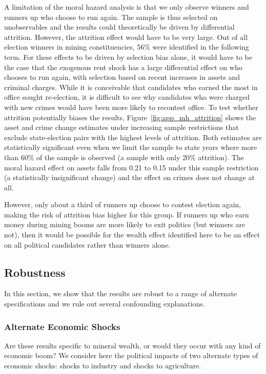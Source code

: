 \documentclass[12pt,letterpaper]{article}
\begin{document}
A limitation of the moral hazard analysis is that we only observe
winners and runners up who choose to run again. The sample is thus
selected on unobservables and the results could theoretically be
driven by differential attrition. However, the attrition effect would
have to be very large. Out of all election winners in mining
constituencies, 56\% were identified in the following term. For these
effects to be driven by selection bias alone, it would have to be the
case that the exogenous rent shock has a large differential effect on
who chooses to run again, with selection based on recent increases in
assets and criminal charges. While it is conceivable that candidates
who earned the most in office sought re-election, it is difficult to
see why candidates who were charged with new crimes would have been
more likely to recontest office. To test whether attrition potentially
biases the results, Figure~\ref{fig:app_mh_attrition} shows the asset
and crime change estimates under increasing sample restrictions that
exclude state-election pairs with the highest levels of
attrition. Both estimates are statistically significant even when we
limit the sample to state years where more than 60\% of the sample is
observed (a sample with only 20\% attrition). The moral hazard effect
on assets falls from 0.21 to 0.15 under this sample restriction (a
statistically insignificant change) and the effect on crimes does not
change at all.

However, only about a third of runners up choose to contest election
again, making the risk of attrition bias higher for this group. If
runners up who earn money during mining booms are more likely to exit
politics (but winners are not), then it would be possible for the
wealth effect identified here to be an effect on all political
candidates rather than winners alone.

\subsection{Robustness}
\label{sec:robust}

In this section, we show that the results are robust to a range of
alternate specifications and we rule out several confounding
explanations.

\subsubsection{Alternate Economic Shocks}

Are these results specific to mineral
wealth, or would they occur with any kind of economic boom? We
consider here the political impacts of two alternate types of economic
shocks: shocks to industry and shocks to
agriculture.
\end{document}
